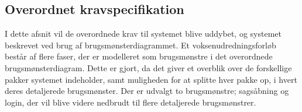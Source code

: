 \documentclass[../../main.tex]{subfiles}
\begin{document}
\subsection{Overordnet kravspecifikation}
I dette afsnit vil de overordnede krav til systemet blive uddybet, og systemet beskrevet ved brug af brugsmønsterdiagrammet. Et voksenudredningsforløb består af flere faser, der er modelleret som brugsmønstre i det overordnede brugsmønsterdiagram. Dette er gjort, da det giver et overblik over de forskellige pakker systemet indeholder, samt muligheden for at splitte hver pakke op, i hvert deres detaljerede brugsmønster. Der er udvalgt to brugsmønstre; sagsåbning og login, der vil blive videre nedbrudt til flere detaljerede brugsmønstrer.
\end{document}
